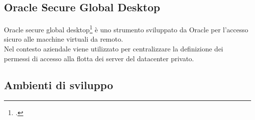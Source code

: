 \subsection{Oracle Secure Global Desktop}
Oracle secure global desktop\footcite{site:osgd}  è uno strumento sviluppato da Oracle per l'accesso sicuro alle macchine virtuali da remoto.\\
Nel contesto aziendale viene utilizzato per centralizzare la definizione dei permessi di accesso alla flotta dei server del \gls{datacenter} privato. 
\subsection{Ambienti di sviluppo}